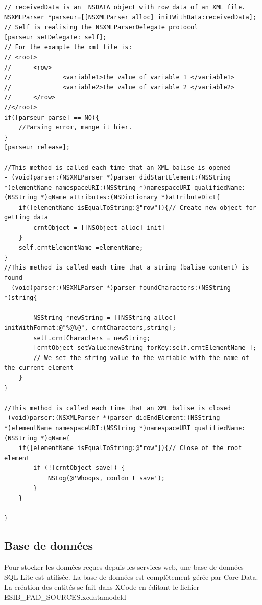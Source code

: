			\begin{lstlisting}[name= Parsing XML, label=NSXMLParser]
// receivedData is an  NSDATA object with row data of an XML file.
NSXMLParser *parseur=[[NSXMLParser alloc] initWithData:receivedData];
// Self is realising the NSXMLParserDelegate protocol
[parseur setDelegate: self];
// For the example the xml file is:
// <root>
//		<row>
//				<variable1>the value of variable 1 </variable1>
//				<variable2>the value of variable 2 </variable2>
//		</row>
//</root>
if([parseur parse] == NO){
	//Parsing error, mange it hier. 
}
[parseur release];	

//This method is called each time that an XML balise is opened
- (void)parser:(NSXMLParser *)parser didStartElement:(NSString *)elementName namespaceURI:(NSString *)namespaceURI qualifiedName:(NSString *)qName attributes:(NSDictionary *)attributeDict{
    if([elementName isEqualToString:@"row"]){// Create new object for getting data
		crntObject = [[NSObject alloc] init]
    }
    self.crntElementName =elementName;
}
//This method is called each time that a string (balise content) is found
- (void)parser:(NSXMLParser *)parser foundCharacters:(NSString *)string{
  
        NSString *newString = [[NSString alloc] initWithFormat:@"%@%@", crntCharacters,string];
        self.crntCharacters = newString;
        [crntObject setValue:newString forKey:self.crntElementName ];
        // We set the string value to the variable with the name of the current element
    }
}

//This method is called each time that an XML balise is closed
-(void)parser:(NSXMLParser *)parser didEndElement:(NSString *)elementName namespaceURI:(NSString *)namespaceURI qualifiedName:(NSString *)qName{
    if([elementName isEqualToString:@"row"]){// Close of the root element
        if (![crntObject save]) {
            NSLog(@'Whoops, couldn t save');
        }
    }
    
}
\end{lstlisting}

	\subsection{Base de données} 
	Pour stocker les données reçues depuis les services web, une base de données SQL-Lite est utilisée. La base de données est complètement gérée par \gls{Core Data}. 
	La création des entités se fait dans \gls{XCode} en éditant le fichier ESIB\_PAD\_SOURCES.xcdatamodeld 
	
